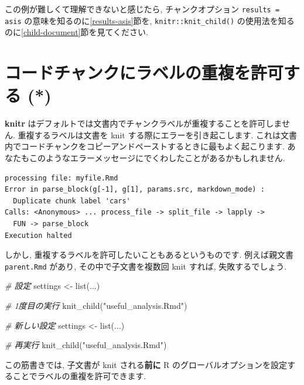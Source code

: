 \documentclass[
  11pt,
  lualatex,
  ja=standard]{bxjsreport}
\newenvironment{Shaded}{\begin{snugshade}}{\end{snugshade}}
\newcommand{\CommentTok}[1]{\textcolor[rgb]{0.56,0.35,0.01}{\textit{#1}}}
\newcommand{\FunctionTok}[1]{\textcolor[rgb]{0.00,0.00,0.00}{#1}}
\newcommand{\NormalTok}[1]{#1}
\newcommand{\OtherTok}[1]{\textcolor[rgb]{0.56,0.35,0.01}{#1}}
\newcommand{\StringTok}[1]{\textcolor[rgb]{0.31,0.60,0.02}{#1}}
\begin{document}
この例が難しくて理解できないと感じたら, チャンクオプション \texttt{results = \textquotesingle{}asis\textquotesingle{}} の意味を知るのに\ref{results-asis}節を, \texttt{knitr::knit\_child()} の使用法を知るのに\ref{child-document}節を見てください.

\hypertarget{duplicate-label}{%
\section{コードチャンクにラベルの重複を許可する (*)}\label{duplicate-label}}

\textbf{knitr} はデフォルトでは文書内でチャンクラベルが重複することを許可しません. 重複するラベルは文書を knit する際にエラーを引き起こします. これは文書内でコードチャンクをコピーアンドペーストするときに最もよく起こります. あなたもこのようなエラーメッセージにでくわしたことがあるかもしれません.

\begin{verbatim}
processing file: myfile.Rmd
Error in parse_block(g[-1], g[1], params.src, markdown_mode) :
  Duplicate chunk label 'cars'
Calls: <Anonymous> ... process_file -> split_file -> lapply ->
  FUN -> parse_block
Execution halted
\end{verbatim}

しかし, 重複するラベルを許可したいこともあるというものです. 例えば親文書 \texttt{parent.Rmd} があり, その中で子文書を複数回 knit すれば, 失敗するでしょう.

\begin{Shaded}
\begin{Highlighting}[numbers=left,,]
\CommentTok{\# 設定}
\NormalTok{settings }\OtherTok{\textless{}{-}} \FunctionTok{list}\NormalTok{(...)}

\CommentTok{\# 1度目の実行}
\FunctionTok{knit\_child}\NormalTok{(}\StringTok{"useful\_analysis.Rmd"}\NormalTok{)}

\CommentTok{\# 新しい設定}
\NormalTok{settings }\OtherTok{\textless{}{-}} \FunctionTok{list}\NormalTok{(...)}

\CommentTok{\# 再実行}
\FunctionTok{knit\_child}\NormalTok{(}\StringTok{"useful\_analysis.Rmd"}\NormalTok{)}
\end{Highlighting}
\end{Shaded}

この筋書きでは, 子文書が knit される\textbf{前に} R のグローバルオプションを設定することでラベルの重複を許可できます.
\end{document}
